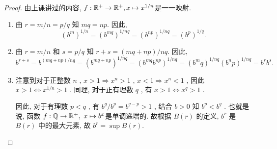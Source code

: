\documentclass{article}
\begin{document}
\begin{proof}
由上课讲过的内容,  $ f: \mathbb{R}^+\to\mathbb{R}^+, x\mapsto x^{1/n} $是一一映射. 

\begin{enumerate}[label=(\alph*)]

\item 由 \( r = m/n = p/q \) 知 \( m q = n p \). 因此,
\[(b^m)^{1/n} = (b^{mq})^{1/nq} = (b^{np})^{1/nq} = (b^p)^{1/q}.\]

\item 由 \( r = m/n \) 和 \( s = p/q \) 知 \( r+s = (mq + np)/nq \). 因此,
\[b^{r+s} = b^{(mq + np)/nq} = (b^{mq + np})^{1/nq} = (b^{mq} b^{np})^{1/nq} = (b^mq)^{1/nq} (b^np)^{1/nq} = b^r b^s.\]

\item 注意到对于正整数 $ n $ ,  $ x>1 \Rightarrow x^n>1 $ , $ x<1\Rightarrow x^n<1 $ , 因此 $ x>1 \Leftrightarrow x^{1/n}>1 $ . 同理, 对于正有理数 $ q $ , 有 $ x>1 \Leftrightarrow x^q>1 $ .\par 
因此, 对于有理数 $ p<q $ , 有 $ b^q/b^p=b^{q-p}>1 $ , 结合 $ b>0 $ 知 $ b^p<b^q $ . 也就是说, 函数 $ f:\mathbb{Q}\to\mathbb{R}^+,\ x\mapsto b^x $是单调递增的. 故根据 $ B(r) $ 的定义,  $ b^r $ 是 $ B(r) $ 中的最大元素, 故 $ b^r=\sup B(r) $.


\end{enumerate}
\end{proof}
\end{document}

